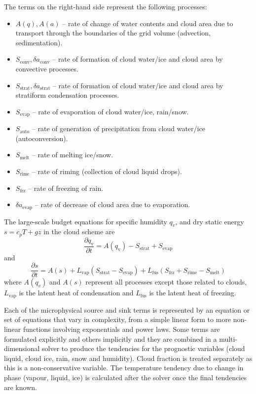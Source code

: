 \documentclass[
a4paper,     %
12pt,        %
article,
onecolumn,   %
openany,     %
]{memoir}
\newlength\drop
\begin{document}
The terms on the right-hand side represent the following processes:
\begin{itemize}
\item    $A(q), A(a)$  -- rate of change of water contents and cloud
area due to transport through the boundaries of the grid volume (advection, 
sedimentation).
\item    $S_{\text{conv}}, \delta a_{\text{conv}}$ -- rate of formation 
of cloud water/ice and cloud area by convective processes.
\item    $S_{\text{strat}}, \delta a_{\text{strat}}$ -- rate of formation 
of cloud water/ice and cloud area by stratiform condensation processes.
\item    $S_{\text{evap}}$ -- rate of evaporation of cloud water/ice, 
rain/snow. 
\item    $S_{\text{auto}}$ -- rate of generation of precipitation from
cloud water/ice (autoconversion).
\item    $S_{\text{melt}}$ -- rate of melting ice/snow.
\item    $S_{\text{rime}}$ -- rate of riming (collection of cloud liquid 
drops).
\item    $S_{\text{frz}} $ -- rate of freezing of rain.
\item    $\delta a_{\text{evap}}$  -- rate of decrease of cloud area due 
to evaporation.
\end{itemize}

The large-scale budget equations for specific humidity $q_v$, 
and dry static energy $s =c_pT +gz$ in the cloud scheme are
\begin{equation}
\frac{\partial q_{\text{v}}}{\partial t} =A(q_{\text{v}}) -S_{\text{strat}} +
S_{\text{evap}}
\end{equation}
and
\begin{equation}
\frac{\partial s}{\partial t} =A(s)+L_{\text{vap}}(S_{\text{strat}} -
S_{\text{evap}})+L_{\text{fus}}(S_{\text{frz}} + S_{\text{rime}} - S_{\text{melt}})
\end{equation}
where $A(q_v)$ and $A(s)$ represent all processes except those
related to clouds, $L_{\text{vap}}$ is the latent heat
of condensation and $L_{\text{fus}}$ is the latent heat
of freezing.

Each of the microphysical source and sink terms is represented by an equation 
or set of equations that vary in complexity, from a simple linear form to more 
non-linear functions involving exponentials and power laws. Some terms are formulated
explicitly and others implicitly and they are combined in a multi-dimensional solver 
to produce the tendencies for the prognostic variables
(cloud liquid, cloud ice, rain, snow and humidity). Cloud fraction is treated
separately as this is a non-conservative variable. The temperature tendency due
to change in phase (vapour, liquid, ice) is calculated after the solver once the
final tendencies are known. 
\end{document}
